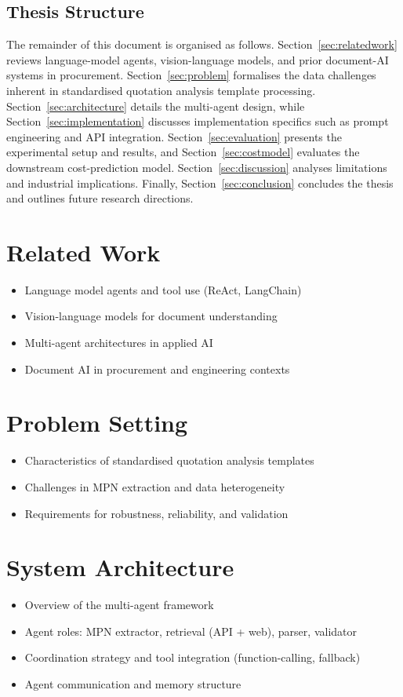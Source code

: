 \documentclass[11pt]{article}
\begin{document}
\subsection{Thesis Structure}
The remainder of this document is organised as follows.  
Section~\ref{sec:relatedwork} reviews language-model agents, vision-language models, and prior document-AI systems in procurement.  
Section~\ref{sec:problem} formalises the data challenges inherent in standardised quotation analysis template processing.  
Section~\ref{sec:architecture} details the multi-agent design, while Section~\ref{sec:implementation} discusses implementation specifics such as prompt engineering and API integration.  
Section~\ref{sec:evaluation} presents the experimental setup and results, and Section~\ref{sec:costmodel} evaluates the downstream cost-prediction model.  
Section~\ref{sec:discussion} analyses limitations and industrial implications.  
Finally, Section~\ref{sec:conclusion} concludes the thesis and outlines future research directions.


\section{Related Work}
\begin{itemize}
  \item Language model agents and tool use (ReAct, LangChain)
  \item Vision-language models for document understanding
  \item Multi-agent architectures in applied AI
  \item Document AI in procurement and engineering contexts
\end{itemize}

\section{Problem Setting}
\begin{itemize}
  \item Characteristics of standardised quotation analysis templates
  \item Challenges in MPN extraction and data heterogeneity
  \item Requirements for robustness, reliability, and validation
\end{itemize}

\section{System Architecture}
\begin{itemize}
  \item Overview of the multi-agent framework
  \item Agent roles: MPN extractor, retrieval (API + web), parser, validator
  \item Coordination strategy and tool integration (function-calling, fallback)
  \item Agent communication and memory structure
\end{itemize}
\end{document}
